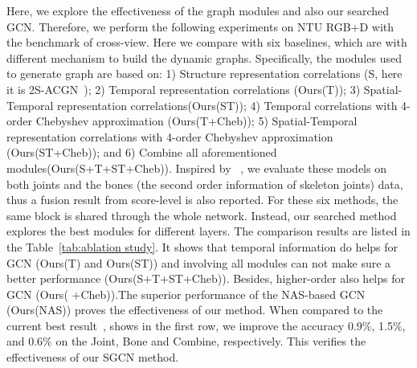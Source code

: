 \documentclass[letterpaper]{article} \usepackage{aaai19}  \usepackage{times}  \usepackage{helvet} \usepackage{courier}  \usepackage[hyphens]{url}  \usepackage{graphicx} \urlstyle{rm} \def\UrlFont{\rm}  \usepackage{graphicx}  \frenchspacing  \setlength{\pdfpagewidth}{8.5in}  \setlength{\pdfpageheight}{11in}
\begin{document}
Here, we explore the effectiveness of the graph modules and also our searched GCN. Therefore, we perform the following experiments on NTU RGB+D with the benchmark of cross-view. Here we compare with six baselines, which are with different mechanism to build the dynamic graphs. Specifically, the modules used to generate graph are based on: 1) Structure representation correlations (S, here it is 2S-ACGN~\cite{shi2019two}); 2) Temporal representation correlations (Ours(T)); 3) Spatial-Temporal representation correlations(Ours(ST)); 4) Temporal correlations with 4-order Chebyshev approximation (Ours(T+Cheb)); 5) Spatial-Temporal representation correlations with 4-order Chebyshev approximation (Ours(ST+Cheb)); and 6) Combine all aforementioned modules(Ours(S+T+ST+Cheb)).  Inspired by ~\cite{shi2019two}, we evaluate these models on both joints and the bones (the second order information of skeleton joints) data, thus a fusion result from score-level is also reported. For these six methods, the same block is shared through the whole network. Instead, our searched method explores the best modules for different layers. The comparison results are listed in the Table~\ref{tab:ablation study}. It shows that temporal information do helps for GCN (Ours(T) and Ours(ST)) and involving all modules can not make sure a better performance (Ours(S+T+ST+Cheb)). Besides, higher-order also helps for GCN (Ours( +Cheb)).The superior performance of the NAS-based GCN (Ours(NAS)) proves the effectiveness of our method. When compared to the current best result~\cite{shi2019two}, shows in the first row, we improve the accuracy 0.9\%, 1.5\%, and 0.6\% on the Joint, Bone and Combine, respectively. This verifies the effectiveness of our SGCN method.  


\begin{table}[t]\footnotesize
\begin{center}
\caption{\small{Ablation Study. Performance comparison on NTU RGB+D with CV evaluation.}}
\vspace{3mm}
\label{tab:ablation study}
\end{center}
\vspace{-2em}

\end{table}
\end{document}
